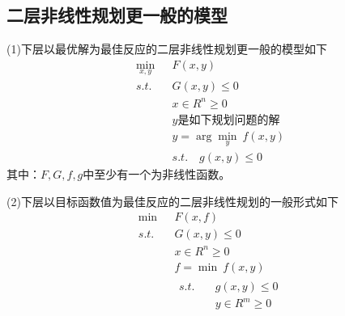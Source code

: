     \subsection{二层非线性规划更一般的模型}
        \par
        (1)下层以最优解为最佳反应的二层非线性规划更一般的模型如下
        \begin{align*}
            \mathop{\min}\limits_{x,y}\ &F(x,y)\\
            s.t.\quad & G(x,y)\leqslant 0\\
            & x\in R^n\geqslant 0\\
            &y\text{是如下规划问题的解}\\
           & y=\arg\mathop{\min}\limits_{y}\ f(x,y)\\
           &s.t.\quad g(x,y) \leqslant 0
        \end{align*}
        其中：$F,G,f,g$中至少有一个为非线性函数。
        \par
        (2)下层以目标函数值为最佳反应的二层非线性规划的一般形式如下
        \begin{align*}
            \mathop{\min}\  &F(x,f)\\
            s.t.\quad & G(x,y)\leqslant 0\\
            & x\in R^n\geqslant 0\\
            &f=\mathop{\min}\ f(x,y)\\
            & \begin{aligned}
            s.t. \quad &g(x,y)\leqslant 0\\
            & y\in R^m\geqslant 0
            \end{aligned}
        \end{align*}



